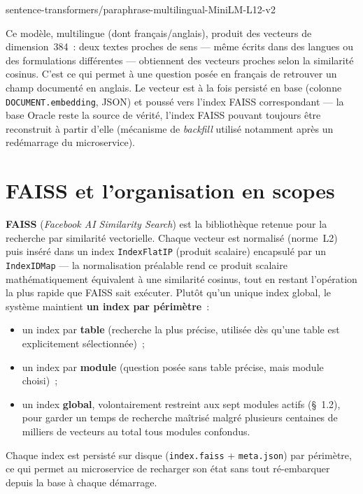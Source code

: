 ﻿\documentclass[12pt,a4paper]{report}
\newcommand{\code}[1]{\texttt{\color{biatbluedk}#1}}
\newcommand{\model}[1]{\begin{center}\ttfamily\color{biatbluedk}#1\end{center}}
\begin{document}
\model{sentence-transformers/paraphrase-multilingual-MiniLM-L12-v2}

Ce modèle, multilingue (dont français/anglais), produit des vecteurs de dimension~384~: deux textes proches de sens --- même écrits dans des langues ou des formulations différentes --- obtiennent des vecteurs proches selon la similarité cosinus. C'est ce qui permet à une question posée en français de retrouver un champ documenté en anglais. Le vecteur est à la fois persisté en base (colonne \code{DOCUMENT.embedding}, JSON) et poussé vers l'index FAISS correspondant --- la base Oracle reste la source de vérité, l'index FAISS pouvant toujours être reconstruit à partir d'elle (mécanisme de \emph{backfill} utilisé notamment après un redémarrage du microservice).

\section{FAISS et l'organisation en scopes}
\textbf{FAISS} (\emph{Facebook AI Similarity Search}) est la bibliothèque retenue pour la recherche par similarité vectorielle. Chaque vecteur est normalisé (norme~L2) puis inséré dans un index \code{IndexFlatIP} (produit scalaire) encapsulé par un \code{IndexIDMap} --- la normalisation préalable rend ce produit scalaire mathématiquement équivalent à une similarité cosinus, tout en restant l'opération la plus rapide que FAISS sait exécuter. Plutôt qu'un unique index global, le système maintient \textbf{un index par périmètre}~:

\begin{itemize}
  \item un index par \textbf{table} (recherche la plus précise, utilisée dès qu'une table est explicitement sélectionnée)~;
  \item un index par \textbf{module} (question posée sans table précise, mais module choisi)~;
  \item un index \textbf{global}, volontairement restreint aux sept modules actifs (\S~1.2), pour garder un temps de recherche maîtrisé malgré plusieurs centaines de milliers de vecteurs au total tous modules confondus.
\end{itemize}

Chaque index est persisté sur disque (\code{index.faiss} + \code{meta.json}) par périmètre, ce qui permet au microservice de recharger son état sans tout ré-embarquer depuis la base à chaque démarrage.
\end{document}
